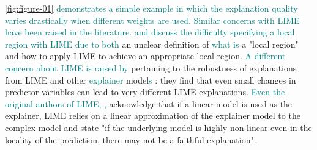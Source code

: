 \documentclass[AMS,STIX2COL]{WileyNJD-v2}\usepackage[]{graphicx}\usepackage[]{color}
\newcommand{\kge}[1]{\textcolor{teal}{#1}}
\renewcommand{\sout}[1]{\unskip}
\begin{document}
% 

\kge{\autoref{fig:figure-01} demonstrates a simple example in which the explanation quality varies drastically when different weights are used. Similar concerns with LIME have been raised in the literature.} \sout{Several sources in the literature discuss the performance of LIME.} \kge{\citet{laugel:2018} and \citet{molnar:2019} discuss the difficulty specifying a local region with LIME due to both} \sout{One of the biggest difficulties with LIME is determining how to specify a local region \citep{laugel:2018} \citep{molnar:2019}. This is due to} an unclear definition of \kge{what is} a "local region" and how to apply LIME to achieve an appropriate local region\sout{ as demonstrated by \autoref{fig:figure-02}}. \kge{A different concern about LIME is raised by} \citet{alvarezmelis:2018} \sout{raise a concern} pertaining to the robustness of explanations from LIME and other \kge{explainer} model\kge{s} \sout{explainers}: they find that even small changes in predictor variables can lead to very different LIME explanations. \kge{Even the original authors of LIME,} \sout{Additionally,} \citet{ribeiro:2016}\kge{,} acknowledge that if a linear model is used as the explainer, LIME relies on a linear approximation of the explainer model to the complex model and state "if the underlying model is highly non-linear even in the locality of the prediction, there may not be a faithful explanation".
\end{document}
